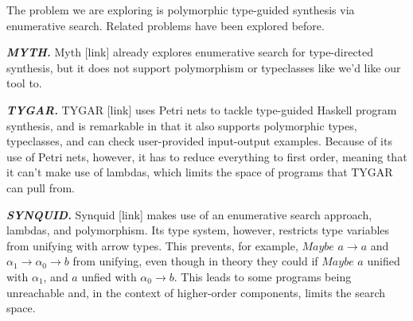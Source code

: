 \documentclass[acmsmall,nonacm]{acmart}
\begin{document}
The problem we are exploring is polymorphic type-guided synthesis via 
enumerative search. Related problems have been explored before. 

\vspace{2mm}
\noindent \textbf{\textit{MYTH.}} Myth [link] already explores enumerative search for 
type-directed synthesis, but it does not support polymorphism or typeclasses 
like we'd like our tool to. 


\vspace{2mm}
\noindent \textbf{\textit{TYGAR.}} TYGAR [link] uses Petri nets to 
tackle type-guided Haskell program synthesis, and is remarkable in that 
it also supports polymorphic types, typeclasses, and can check 
user-provided input-output examples. Because of its use of Petri nets, 
however, it has to reduce everything to first order, meaning that 
it can't make use of lambdas, which limits the space of programs that
TYGAR can pull from.


\vspace{2mm}
\noindent \textbf{\textit{SYNQUID.}} Synquid [link] makes 
use of an enumerative search approach, lambdas, and polymorphism. 
Its type system, however, restricts type variables
from unifying with arrow types. This prevents, for example, 
${Maybe}$ ${a \to a}$ 
and ${\alpha_1 \to \alpha_0 \to b}$ from unifying, even though in theory
they could if $Maybe$ $a$ unified with $\alpha_1$, and $a$ unfied 
with $\alpha_0 \to b$. This leads to some programs being unreachable
and, in the context of higher-order components, limits the search space. 




\end{document}
